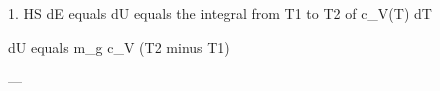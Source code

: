 1. HS  
dE equals dU equals the integral from T1 to T2 of c_V(T) dT  

dU equals m_g c_V (T2 minus T1)  

---